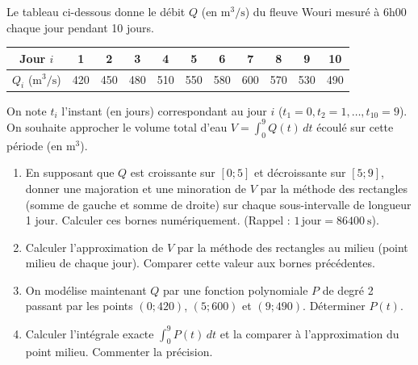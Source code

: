\documentclass[11pt]{article}
\begin{document}
\begin{exercice}
Le tableau ci-dessous donne le débit $Q$ (en $\text{m}^3/\text{s}$) du fleuve Wouri mesuré à 6h00 chaque jour pendant 10 jours.
\begin{center}
\begin{tabular}{|c|c|c|c|c|c|c|c|c|c|c|}
\hline
Jour $i$ & 1 & 2 & 3 & 4 & 5 & 6 & 7 & 8 & 9 & 10 \\ \hline
$Q_i$ ($\text{m}^3/\text{s}$) & 420 & 450 & 480 & 510 & 550 & 580 & 600 & 570 & 530 & 490 \\ \hline
\end{tabular}
\end{center}
On note $t_i$ l'instant (en jours) correspondant au jour $i$ ($t_1=0, t_2=1, \dots, t_{10}=9$). On souhaite approcher le volume total d'eau $V = \int_{0}^{9} Q(t)\,dt$ écoulé sur cette période (en $\text{m}^3$).
\begin{enumerate}
    \item En supposant que $Q$ est croissante sur $[0; 5]$ et décroissante sur $[5; 9]$, donner une majoration et une minoration de $V$ par la méthode des rectangles (somme de gauche et somme de droite) sur chaque sous-intervalle de longueur 1 jour. Calculer ces bornes numériquement. (Rappel : $1\,\text{jour} = \SI{86400}{\second}$).
    \item Calculer l'approximation de $V$ par la méthode des rectangles au milieu (point milieu de chaque jour). Comparer cette valeur aux bornes précédentes.
    \item On modélise maintenant $Q$ par une fonction polynomiale $P$ de degré 2 passant par les points $(0; 420)$, $(5; 600)$ et $(9; 490)$. Déterminer $P(t)$.
    \item Calculer l'intégrale exacte $\int_{0}^{9} P(t)\,dt$ et la comparer à l'approximation du point milieu. Commenter la précision.
\end{enumerate}
\end{exercice}
\end{document}

